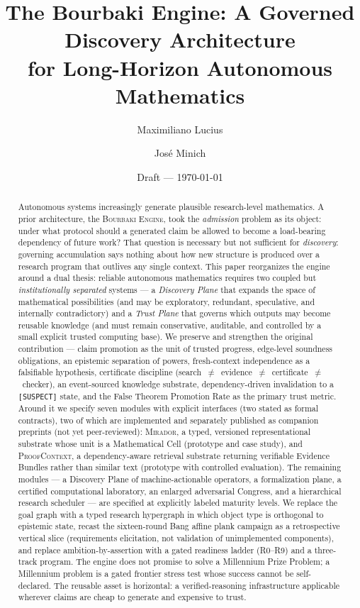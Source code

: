 \documentclass[11pt]{amsart}
\title[The Bourbaki Engine]{The Bourbaki Engine: A Governed Discovery
Architecture\\ for Long-Horizon Autonomous Mathematics}
\author{Maximiliano Lucius}
\author{Jos\'e Minich}
\date{Draft --- \today}
\theoremstyle{definition}
\theoremstyle{remark}
\newcommand{\engine}{\textsc{Bourbaki Engine}}
\newcommand{\mirador}{\textsc{Mirador}}
\newcommand{\pc}{\textsc{ProofContext}}
\newcommand{\state}[1]{\texttt{[#1]}}
\begin{document}
\begin{abstract}
Autonomous systems increasingly generate plausible research-level mathematics.
A prior architecture, the \engine{}, took the \emph{admission} problem as its
object: under what protocol should a generated claim be allowed to become a
load-bearing dependency of future work? That question is necessary but not
sufficient for \emph{discovery}: governing accumulation says nothing about how
new structure is produced over a research program that outlives any single
context. This paper reorganizes the engine around a dual thesis: reliable
autonomous mathematics requires two coupled but \emph{institutionally separated}
systems --- a \emph{Discovery Plane} that expands the space of mathematical
possibilities (and may be exploratory, redundant, speculative, and internally
contradictory) and a \emph{Trust Plane} that governs which outputs may become
reusable knowledge (and must remain conservative, auditable, and controlled by a
small explicit trusted computing base). We preserve and strengthen the original
contribution --- claim promotion as the unit of trusted progress, edge-level
soundness obligations, an epistemic separation of powers, fresh-context
independence as a falsifiable hypothesis, certificate discipline
(search~$\neq$~evidence~$\neq$~certificate~$\neq$~checker), an event-sourced
knowledge substrate, dependency-driven invalidation to a \state{SUSPECT} state,
and the False Theorem Promotion Rate as the primary trust metric. Around it we
specify seven modules with explicit interfaces (two stated as formal contracts),
two of which are implemented and separately published as companion preprints
(not yet peer-reviewed): \mirador{}, a typed, versioned representational
substrate whose unit is a Mathematical Cell (prototype and case study), and
\pc{}, a dependency-aware retrieval substrate returning verifiable Evidence
Bundles rather than similar text (prototype with controlled evaluation). The
remaining modules --- a Discovery Plane of machine-actionable operators, a
formalization plane, a certified computational laboratory, an enlarged
adversarial Congress, and a hierarchical research scheduler --- are specified at
explicitly labeled maturity levels. We replace the goal graph with a typed
research hypergraph in which object type is orthogonal to epistemic state, recast
the sixteen-round Bang affine plank campaign as a retrospective vertical slice
(requirements elicitation, not validation of unimplemented components), and
replace ambition-by-assertion with a gated readiness ladder (R0--R9) and a
three-track program. The engine does not promise to solve a Millennium Prize
Problem; a Millennium problem is a gated frontier stress test whose success
cannot be self-declared. The reusable asset is horizontal: a
verified-reasoning infrastructure applicable wherever claims are cheap to
generate and expensive to trust.
\end{abstract}
\end{document}
